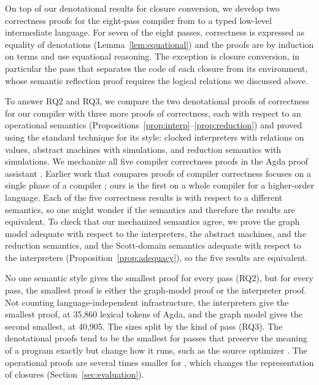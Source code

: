 On top of our denotational results for closure conversion, we develop
two correctness proofs for the eight-pass compiler from \fpc{} to a
typed low-level intermediate language. For seven of the eight passes,
correctness is expressed as equality of denotations
(Lemma~\ref{lem:equational}) and the proofs are by induction on terms
and use equational reasoning. The exception is closure conversion, in
particular the  pass that separates the code of each
closure from its environment, whose semantic reflection proof requires
the logical relations we discussed above.

To answer RQ2 and RQ3, we compare the two denotational proofs of
correctness for our \fpc{} compiler with three more proofs of
correctness, each with respect to an operational semantics
(Propositions~\ref{prop:interp}--\ref{prop:reduction}) and proved
using the standard technique for its style: clocked interpreters with
relations on values, abstract machines with simulations, and reduction
semantics with simulations.  We mechanize all five compiler
correctness proofs in the Agda proof assistant \citep{Agda}.  Earlier
work that compares proofs of compiler correctness focuses on a single
phase of a compiler \citep{Owens:2016aa,Kahn:2025aa,Knothe:2026aa};
ours is the first on a whole compiler for a higher-order language.
Each of the five correctness results is with respect to a different
semantics, so one might wonder if the semantics and therefore the
results are equivalent. To check that our mechanized semantics agree,
we prove the graph model adequate with respect to the interpreters,
the abstract machines, and the reduction semantics, and the
Scott-domain semantics adequate with respect to the interpreters
(Proposition~\ref{prop:adequacy}), so the five results are equivalent.

No one semantic style gives the smallest proof for every pass (RQ2),
but for every pass, the smallest proof is either the graph-model proof
or the interpreter proof. Not counting language-independent
infrastructure, the interpreters give the smallest proof, at 35,860
lexical tokens of Agda, and the graph model gives the second smallest,
at 40,905. The sizes split by the kind of pass (RQ3). The denotational
proofs tend to be the smallest for passes that preserve the meaning of
a program exactly but change how it runs, such as the source
optimizer . The operational proofs are several times
smaller for , which changes the representation of
closures (Section~\ref{sec:evaluation}).

